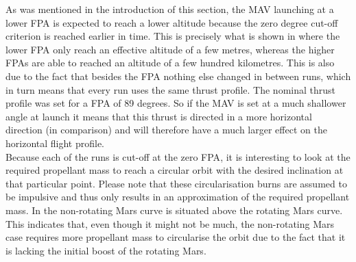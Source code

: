 \noindent
As was mentioned in the introduction of this section, the \ac{MAV} launching at a lower \ac{FPA} is expected to reach a lower altitude because the zero degree cut-off criterion is reached earlier in time. This is precisely what is shown in  where the lower \ac{FPA} only reach an effective altitude of a few metres, whereas the higher \ac{FPA}s are able to reached an altitude of a few hundred kilometres. This is also due to the fact that besides the \ac{FPA} nothing else changed in between runs, which in turn means that every run uses the same thrust profile. The nominal thrust profile was set for a \ac{FPA} of 89 degrees. So if the \ac{MAV} is set at a much shallower angle at launch it means that this thrust is directed in a more horizontal direction (in comparison) and will therefore have a much larger effect on the horizontal flight profile.\\

\noindent
Because each of the runs is cut-off at the zero \ac{FPA}, it is interesting to look at the required propellant mass to reach a circular orbit with the desired inclination at that particular point. Please note that these circularisation burns are assumed to be impulsive and thus only results in an approximation of the required propellant mass. In  the non-rotating Mars curve is situated above the rotating Mars curve. This indicates that, even though it might not be much, the non-rotating Mars case requires more propellant mass to circularise the orbit due to the fact that it is lacking the initial boost of the rotating Mars.


